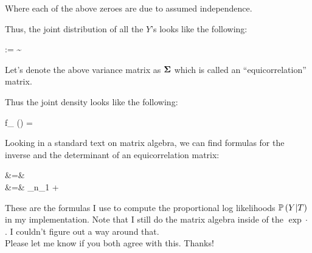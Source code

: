 Where each of the above zeroes are due to assumed independence. 

Thus, the joint distribution of all the $Y$'s looks like the following:

\beqn
\Y :=  \sim {}
\eeqn

Let's denote the above variance matrix as $\boldsymbol{\Sigma}$ which is called an ``equicorrelation'' matrix.

Thus the joint density looks like the following:

\beqn
f_{\Y} (\y) =  \exp{-\half \y^\top \bSigmainv \y}
\eeqn

Looking in a standard text on matrix algebra, we can find formulas for the inverse and the determinant of an equicorrelation matrix:

\beqn
\abss{\bSigma} &=&   \\
\bSigmainv &=&   _{n_1} + \oneover{\sigsq} 
\eeqn

These are the formulas I use to compute the proportional log likelihoods $\mathbb{P}\left(Y | T\right)$ in my implementation. Note that I still do the matrix algebra inside of the $\exp{\cdot}$. I couldn't figure out a way around that.\\

Please let me know if you both agree with this. Thanks!


